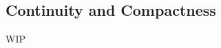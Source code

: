 \documentclass[../poma-notes.tex]{subfiles}
\begin{document}
\subsection*{Continuity and Compactness}

WIP
\end{document}
